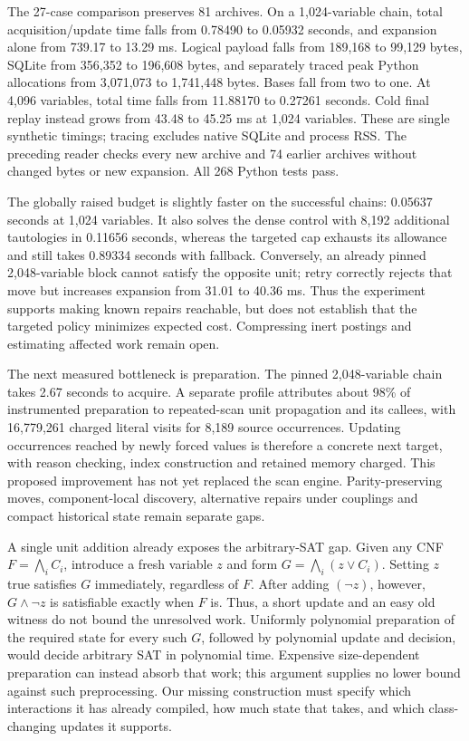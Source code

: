 \documentclass[11pt,a4paper]{article}
\numberwithin{equation}{section}
\theoremstyle{plain}
\theoremstyle{definition}
\theoremstyle{remark}
\begin{document}
The 27-case comparison preserves 81 archives. On a 1,024-variable chain, total acquisition/update time falls from 0.78490 to 0.05932 seconds, and expansion alone from 739.17 to 13.29 ms. Logical payload falls from 189,168 to 99,129 bytes, SQLite from 356,352 to 196,608 bytes, and separately traced peak Python allocations from 3,071,073 to 1,741,448 bytes. Bases fall from two to one. At 4,096 variables, total time falls from 11.88170 to 0.27261 seconds. Cold final replay instead grows from 43.48 to 45.25 ms at 1,024 variables. These are single synthetic timings; tracing excludes native SQLite and process RSS. The preceding reader checks every new archive and 74 earlier archives without changed bytes or new expansion. All 268 Python tests pass.

The globally raised budget is slightly faster on the successful chains: 0.05637 seconds at 1,024 variables. It also solves the dense control with 8,192 additional tautologies in 0.11656 seconds, whereas the targeted cap exhausts its allowance and still takes 0.89334 seconds with fallback. Conversely, an already pinned 2,048-variable block cannot satisfy the opposite unit; retry correctly rejects that move but increases expansion from 31.01 to 40.36 ms. Thus the experiment supports making known repairs reachable, but does not establish that the targeted policy minimizes expected cost. Compressing inert postings and estimating affected work remain open.

The next measured bottleneck is preparation. The pinned 2,048-variable chain takes 2.67 seconds to acquire. A separate profile attributes about 98\% of instrumented preparation to repeated-scan unit propagation and its callees, with 16,779,261 charged literal visits for 8,189 source occurrences. Updating occurrences reached by newly forced values is therefore a concrete next target, with reason checking, index construction and retained memory charged. This proposed improvement has not yet replaced the scan engine. Parity-preserving moves, component-local discovery, alternative repairs under couplings and compact historical state remain separate gaps.

A single unit addition already exposes the arbitrary-SAT gap. Given any CNF $F=\bigwedge_i C_i$, introduce a fresh variable $z$ and form $G=\bigwedge_i(z\lor C_i)$. Setting $z$ true satisfies $G$ immediately, regardless of $F$. After adding $(\neg z)$, however, $G\land\neg z$ is satisfiable exactly when $F$ is. Thus, a short update and an easy old witness do not bound the unresolved work. Uniformly polynomial preparation of the required state for every such $G$, followed by polynomial update and decision, would decide arbitrary SAT in polynomial time. Expensive size-dependent preparation can instead absorb that work; this argument supplies no lower bound against such preprocessing. Our missing construction must specify which interactions it has already compiled, how much state that takes, and which class-changing updates it supports.
\end{document}
